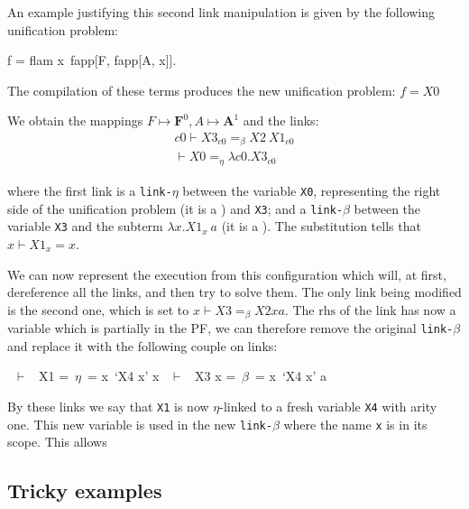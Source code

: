 \documentclass[sigconf,natbib=false,review]{acmart}
\newcommand{\linkbeta}{\texttt{link-}\ensuremath{\beta}\xspace}
\newcommand{\linketa}{\texttt{link-}\ensuremath{\eta}\xspace}
\newcommand{\linketaM}[3]{\ensuremath{#1 \vdash #2 =_\eta #3}}
\newcommand{\linkbetaM}[3]{\ensuremath{#1 \vdash #2 =_\beta #3}}
\newcommand{\substCell}[3]{\ensuremath{#1 \vdash #2 = #3}}
\newcommand{\mapping}[3]{\ensuremath{#1 \mapsto #2^#3}}
\newcommand{\rhs}{\ensuremath{\mathrm{rhs}}\xspace}
\begin{document}
An example justifying this second  link manipulation is given by the following
unification problem:

\def\varF{\ensuremath{\textbf{F}}\xspace}
\def\varA{\ensuremath{\textbf{A}}\xspace}
\def\varB{\ensuremath{\textbf{B}}\xspace}

\begin{elpicode}
  f = flam x\ fapp[F, fapp[A, x]].
\end{elpicode}


The compilation of these terms produces the new unification problem: $f = X0$

We obtain the mappings $\mapping{F}{\varF}{0}, \mapping{A}{\varA}{1}$ and the links:
%
\begin{gather}
  \linkbetaM{c0}{X3_{c0}}{X2~X1_{c0}}\\
  \linketaM{}{X0}{\lambda c0.X3_{c0}}
\end{gather}

\noindent
where the first link is a \linketa between the variable \texttt{X0}, representing
the right side of the unification problem (it is a \maybeeta) and
\texttt{X3}; and a \linkbeta between the variable \texttt{X3} and the subterm
$\lambda x.X1_x ~ a$ (it is a \maybebeta).
The substitution tells that \substCell{x}{X1_x}{x}.

We can now represent the \hrun execution from this configuration which will, at
first, dereference all the links, and then try to solve them. The only link
being modified is the second one, which is set to \linkbetaM{x}{X3}{X2 x a}. The
\rhs of the link has now a variable which is partially in the PF, we can
therefore remove the original \linkbeta and replace it with the following couple
on links:

\begin{textcode}
  ~$\vdash$~ X1   =~$\eta$~= x\ `X4 x'
x ~$\vdash$~ X3 x =~$\beta$~= x\ `X4 x' a
\end{textcode}

By these links we say that \texttt{X1} is now $\eta$-linked to a fresh variable
\texttt{X4} with arity one. This new variable is used in the new \linkbeta where
the name \texttt{x} is in its scope. This allows

\subsection{Tricky examples}
\end{document}
